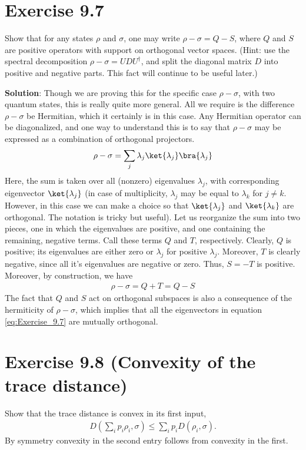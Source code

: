 \documentclass{book}
\begin{document}
\section*{Exercise 9.7}
    Show that for any states $\rho$ and $\sigma$, one may write $\rho-\sigma = Q-S$, where $Q$ and $S$ are positive operators with support on orthogonal vector spaces. (Hint: use the spectral decomposition $\rho -\sigma = U DU^\dagger$, and split the diagonal matrix $D$ into positive and negative parts. This fact will continue to be useful later.)
    
    \textbf{Solution}: Though we are proving this for the specific case $\rho -\sigma$, with two quantum states, this is really quite more general. All we require is the difference $\rho - \sigma$ be Hermitian, which it certainly is in this case. Any Hermitian operator can be diagonalized, and one way to understand this is to say that $\rho - \sigma$ may be expressed as a combination of orthogonal projectors.
    \begin{align} \label{eq:Exercise_9.7}
        \rho - \sigma = \sum_j \lambda_j \ket{\lambda_j}\bra{\lambda_j}
    \end{align}
    Here, the sum is taken over all (nonzero) eigenvalues $\lambda_j$, with corresponding eigenvector $\ket{\lambda_j}$ (in case of multiplicity, $\lambda_j$ may be equal to $\lambda_k$ for $j\neq k$. However, in this case we can make a choice so that $\ket{\lambda_j}$ and $\ket{\lambda_k}$ are orthogonal. The notation is tricky but useful). Let us reorganize the sum into two pieces, one in which the eigenvalues are positive, and one containing the remaining, negative terms. Call these terms $Q$ and $T$, respectively. Clearly, $Q$ is positive; its eigenvalues are either zero or $\lambda_j$ for positive $\lambda_j$. Moreover, $T$ is clearly negative, since all it's eigenvalues are negative or zero. Thus, $S = -T$ is positive. Moreover, by construction, we have
    \begin{align}
        \rho - \sigma = Q + T = Q - S
    \end{align}
    The fact that $Q$ and $S$ act on orthogonal subspaces is also a consequence of the hermiticity of $\rho -\sigma$, which implies that all the eigenvectors in equation \eqref{eq:Exercise_9.7} are mutually orthogonal.

\section*{Exercise 9.8 (Convexity of the trace distance)} 
    Show that the trace distance is convex in its first input,
    \begin{align}
        D\left(\sum_i p_i\rho_i, \sigma\right) \leq \sum_i p_i D(\rho_i, \sigma).
    \end{align}
    By symmetry convexity in the second entry follows from convexity in the first.
    
\end{document}
